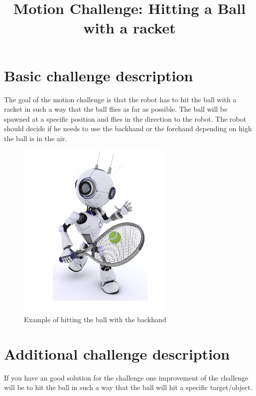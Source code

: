 \documentclass[12pt]{article}
\title{Motion Challenge: Hitting a Ball with a racket }
\author{}
\date{}
\newenvironment{sciabstract}{%
\begin{quote} \bf}
{\end{quote}}
\begin{document}
 

\maketitle 

\begin{sciabstract}
\end{sciabstract}


\section*{Basic challenge description}
The goal of the motion challenge is that the robot has to hit the ball with a racket in such a way that the ball flies as far as possible. The ball will be spawned at a specific position and flies in the direction to the robot. The robot should decide if he needs to use the backhand or the forehand depending on high the ball is in the air.

\begin{figure}[h]
	\includegraphics[scale=0.5]{backhand}
	\centering
	\caption{Example of hitting the ball with the backhand}
\end{figure}

\section*{Additional challenge description}
If you have an good solution for the challenge one improvement of the challenge will be to hit the ball in such a way that the ball will hit a specific target/object. 
\end{document}
